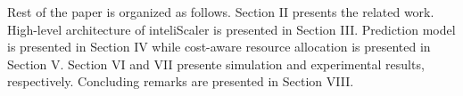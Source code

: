 Rest of the paper is organized as follows. Section II presents the related work. High-level architecture of inteliScaler is presented in Section III. Prediction model is presented in Section IV while cost-aware resource allocation is presented in Section V. Section VI and VII presente simulation and experimental results, respectively. Concluding remarks are presented in Section VIII.